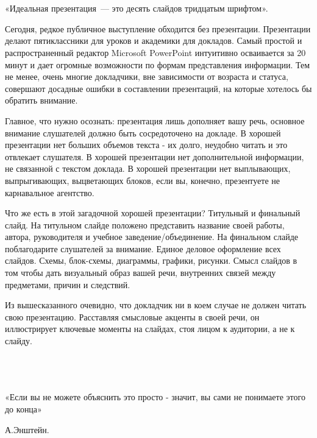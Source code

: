 {\hypertarget{lesson7x5}{}}\\\\

\begin{flushright}
	«Идеальная презентация~--- это десять слайдов тридцатым шрифтом».
\end{flushright}

Сегодня, редкое публичное выступление обходится без презентации. Презентации делают пятиклассники для уроков и академики для докладов. Самый простой и распространенный редактор Microsoft PowerPoint интуитивно осваивается за 20 минут и дает огромные возможности по формам представления информации. Тем не менее, очень многие докладчики, вне зависимости от возраста и статуса, совершают досадные ошибки в составлении презентаций, на которые хотелось бы обратить внимание.

Главное, что нужно осознать: презентация лишь дополняет вашу речь, основное внимание слушателей должно быть сосредоточено на докладе. В хорошей презентации нет больших объемов текста - их долго, неудобно читать и это отвлекает слушателя. В хорошей презентации нет дополнительной информации, не связанной с текстом доклада. В хорошей презентации нет выплывающих, выпрыгивающих, выцветающих блоков, если вы, конечно, презентуете не карнавальное агентство.

Что же есть в этой загадочной хорошей презентации? Титульный и финальный слайд. На титульном слайде положено представить название своей работы, автора, руководителя и учебное заведение/объединение. На финальном слайде поблагодарите слушателей за внимание. Единое деловое оформление всех слайдов. Схемы, блок-схемы, диаграммы, графики, рисунки. Смысл слайдов в том чтобы дать визуальный образ вашей речи, внутренних связей между предметами, причин и следствий.

Из вышесказанного очевидно, что докладчик ни в коем случае не должен читать свою презентацию. Расставляя смысловые акценты в своей речи, он иллюстрирует ключевые моменты на слайдах, стоя лицом к аудитории, а не к слайду.\\\\

{\hypertarget{lesson7x6}{}}\\\\	

\begin{flushright}
	«Если вы не можете объяснить это просто - значит, вы сами не понимаете этого до конца»	
	
	А.Энштейн.
\end{flushright}

